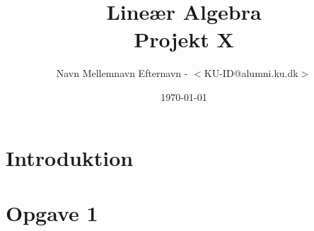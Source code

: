 \documentclass{article}
\title{Lineær Algebra \\ Projekt X}
\author{Navn Mellemnavn Efternavn - $<$KU-ID@alumni.ku.dk$>$}
\date{\today}
\begin{document}
\maketitle

\tableofcontents

\newpage


\section{Introduktion}


\newpage



\section{Opgave 1}







\end{document}
